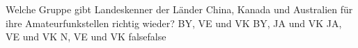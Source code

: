     {Welche Gruppe gibt Landeskenner der Länder China, Kanada und Australien für ihre Amateurfunkstellen richtig wieder?}
    {BY, VE und VK}
    {BY, JA und VK}
    {JA, VE und VK}
    {N, VE und VK}
    {false}{false}